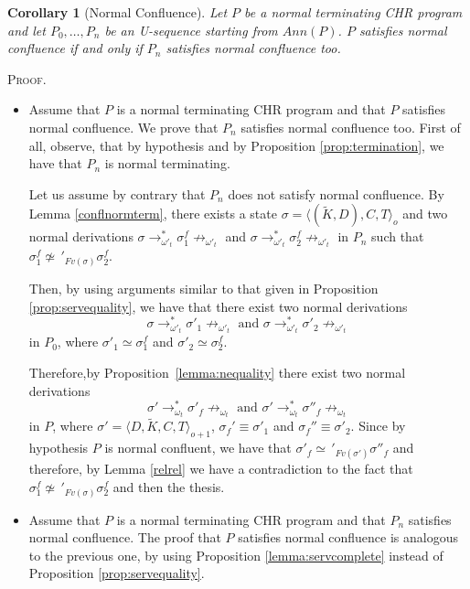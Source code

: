 \documentclass[final]{acmtrans2e}
\newtheorem{corollary}[theorem]{Corollary}
\newcommand{\rrarrow}{\longrightarrow}
\begin{document}
\begin{corollary}[Normal Confluence] Let $P$ be a normal terminating CHR program and let $P_0, \ldots, P_n$
be an U-sequence starting from $Ann(P)$. $P$ satisfies normal confluence if and only if $P_n$
satisfies normal confluence too.
\end{corollary}
\textsc{Proof.}
\begin{itemize}
  \item Assume that $P$ is a normal terminating CHR program and that $P$ satisfies normal confluence. We prove that $P_n$
satisfies normal confluence too.
First of all, observe, that by hypothesis and by Proposition \ref{prop:termination}, we have that $P_n$ is normal terminating.


Let us assume by contrary that $P_n$ does not satisfy normal confluence.
By Lemma \ref{conflnormterm},  there exists a state $\sigma = \langle (\tilde K,D),C,
T\rangle_o$ and two normal derivations $\sigma\rrarrow_{\omega'_t}^{*} \sigma_1^f \not \rrarrow_{\omega'_t} $ and $\sigma\rrarrow_{\omega'_t}^{*}\sigma_2^f\not \rrarrow_{\omega'_t}$ in $P_n$ such that
$\sigma_1^f\not \simeq\,'_{Fv(\sigma)} \sigma_2^f$.

Then, by using arguments similar to that given in Proposition \ref{prop:servequality}, we have that there exist two normal derivations
\[\sigma \rrarrow_{\omega'_t}^{*}\sigma'_1\not \rrarrow_{\omega'_t} \mbox{ and } \sigma \rrarrow_{\omega'_t}^{*}\sigma'_2\not \rrarrow_{\omega'_t}\]
in $P_0$, where
$\sigma'_1 \simeq \sigma_1^f$ and $\sigma'_2 \simeq \sigma_2^f$.

Therefore,by  Proposition~\ref{lemma:nequality}  there exist two normal derivations
\[\sigma'\rrarrow_{\omega_t}^{*}\sigma'_f\not \rrarrow_{\omega_t} \mbox{ and } \sigma'\rrarrow_{\omega_t}^{*}\sigma''_f\not \rrarrow_{\omega_t}\]
in $P$, where
$\sigma'=\langle D,\tilde  K,C, T\rangle_{o+1}$, $\sigma_f' \equiv \sigma'_1$ and $\sigma_f'' \equiv \sigma'_2$. Since  by hypothesis $P$ is normal confluent, we have that $\sigma'_f\simeq\,'_{Fv(\sigma')} \sigma''_f$ and therefore, by Lemma \ref{relrel} we have a contradiction to the fact that $\sigma_1^f\not \simeq\,'_{Fv(\sigma)} \sigma_2^f$ and then the thesis.



  \item Assume that $P$ is a normal terminating CHR program and that $P_n$ satisfies normal confluence. The proof that $P$
satisfies normal confluence is analogous to the previous one, by using Proposition \ref{lemma:servcomplete} instead of Proposition \ref{prop:servequality}.
\end{itemize}
\end{document}
